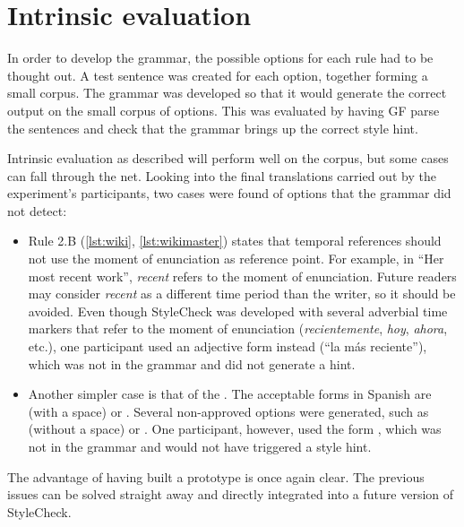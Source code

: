 \section{Intrinsic evaluation}

\noindent In order to develop the grammar, the possible options for each rule had to be thought out. A test sentence was created for each option, together forming a small corpus. The grammar was developed so that it would generate the correct output on the small corpus of options. This was evaluated by having \ac{GF} parse the sentences and check that the grammar brings up the correct style hint.

Intrinsic evaluation as described will perform well on the corpus, but some cases can fall through the net. Looking into the final translations carried out by the experiment's participants, two cases were found of options that the grammar did not detect:

\begin{itemize}
    \item Rule 2.B (\autoref{lst:wiki}, \autoref{lst:wikimaster}) states that temporal references should not use the moment of enunciation as reference point. For example, in ``Her most recent work'', \textit{recent} refers to the moment of enunciation. Future readers may consider \textit{recent} as a different time period than the writer, so it should be avoided. Even though StyleCheck was developed with several adverbial time markers that refer to the moment of enunciation (\textit{recientemente}, \textit{hoy}, \textit{ahora}, etc.), one participant used an adjective form instead (``la más reciente''), which was not in the grammar and did not generate a hint.
    \item Another simpler case is that of the . The acceptable forms in Spanish are  (with a space) or . Several non-approved options were generated, such as  (without a space) or . One participant, however, used the form , which was not in the grammar and would not have triggered a style hint.
\end{itemize}

The advantage of having built a prototype is once again clear. The previous issues can be solved straight away and directly integrated into a future version of StyleCheck.
